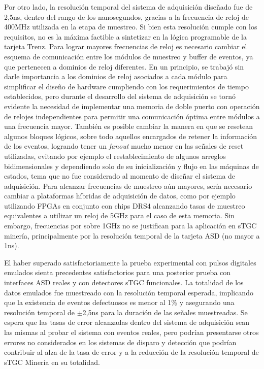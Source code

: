 Por otro lado, la resolución temporal del sistema de adquisición diseñado fue de 2,5ns, dentro del rango de los nanosegundos, gracias a la frecuencia de reloj de 400MHz utilizada en la etapa de muestreo. Si bien esta resolución cumple con los requisitos, no es la máxima factible a sintetizar en la lógica programable de la tarjeta Trenz. Para lograr mayores frecuencias de reloj es necesario cambiar el esquema de comunicación entre los módulos de muestreo y buffer de eventos, ya que pertenecen a dominios de reloj diferentes. En un principio, se trabajó sin darle importancia a los dominios de reloj asociados a cada módulo para simplificar el diseño de hardware cumpliendo con los requerimientos de tiempo establecidos, pero durante el desarrollo del sistema de adquisición se tornó evidente la necesidad de implementar una memoria de doble puerto con operación de relojes independientes para permitir una comunicación óptima entre módulos a una frecuencia mayor.  También es posible cambiar la manera en que se resetean algunos bloques lógicos, sobre todo aquellos encargados de retener la información de los eventos, logrando tener un \textit{fanout} mucho menor en las señales de reset utilizadas, evitando por ejemplo el restablecimiento de algunos arreglos bidimensionales y dependiendo solo de su inicialización y flujo en las máquinas de estados, tema que no fue considerado al momento de diseñar el sistema de adquisición.  Para alcanzar frecuencias de muestreo aún mayores, sería necesario cambiar a plataformas híbridas de adquisición de datos, como por ejemplo utilizando FPGAs en conjunto con chips DRS4\cite{RittDRS4Array} alcanzando tasas de muestreo equivalentes a utilizar un reloj de 5GHz para el caso de esta memoria. Sin embargo, frecuencias por sobre 1GHz no se justifican para la aplicación en sTGC minería, principalmente por la resolución temporal de la tarjeta ASD (no mayor a 1ns).

El haber superado satisfactoriamente la prueba experimental con pulsos digitales emulados sienta precedentes satisfactorios para una posterior prueba con interfaces ASD reales y con detectores sTGC funcionales. La totalidad de los datos emulados fue muestreado con la resolución temporal esperada, implicando que la existencia de eventos defectuosos es menor al 1\% y asegurando una resolución temporal de $\pm$2,5ns para la duración de las señales muestreadas. Se espera que las tasas de error alcanzadas dentro del sistema de adquisición sean las mismas al probar el sistema con eventos reales, pero podrían presentarse otros errores no considerados en los sistemas de disparo y detección que podrían contribuir al alza de la tasa de error y a la reducción de la resolución temporal de sTGC Minería en su totalidad.


